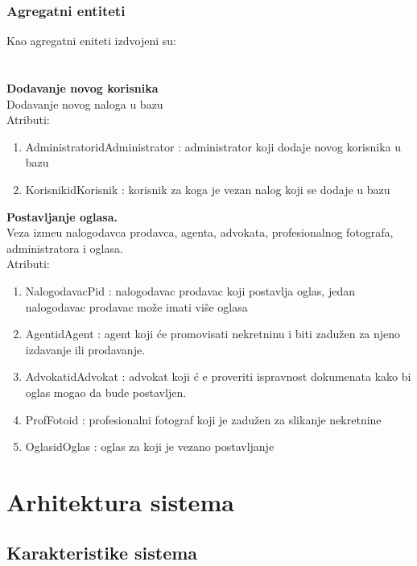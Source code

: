 \documentclass[20pt]{article}
\begin{document}
\subsubsection{\bfseries \large Agregatni entiteti}
Kao agregatni eniteti izdvojeni su:\\
\\
\\
{\bfseries Dodavanje novog korisnika}\\
Dodavanje novog naloga u bazu\\
\indent Atributi:
\begin{enumerate}
        \item  AdministratoridAdministrator : administrator koji dodaje novog korisnika u bazu
        \item KorisnikidKorisnik : korisnik za koga je vezan nalog koji se dodaje u bazu
\end{enumerate}
{\bfseries Postavljanje oglasa.}\\
Veza izme\dj u nalogodavca prodavca, agenta, advokata, profesionalnog fotografa, administratora i oglasa.\\
\indent Atributi:
\begin{enumerate}
        \item  NalogodavacPid : nalogodavac prodavac koji postavlja oglas, jedan nalogodavac prodavac mo\v {z}e imati vi\v {s}e oglasa
        \item  AgentidAgent : agent koji \' ce promovisati nekretninu i biti zadu\v {z}en za njeno izdavanje ili prodavanje.
        \item  AdvokatidAdvokat : advokat koji \'c e proveriti ispravnost dokumenata kako bi oglas mogao da bude postavljen.
        \item ProfFotoid : profesionalni fotograf koji je zadu\v {z}en za slikanje nekretnine
        \item OglasidOglas : oglas za koji je vezano postavljanje
\end{enumerate}

\newpage
\section{\bfseries \Large Arhitektura sistema} 
\setlength{\parindent}{1cm}
\fontsize{13}{18} \selectfont 

\subsection{\bfseries \Large Karakteristike sistema}
\setlength{\parindent}{1cm}
\fontsize{13}{18} \selectfont 
\end{document}
